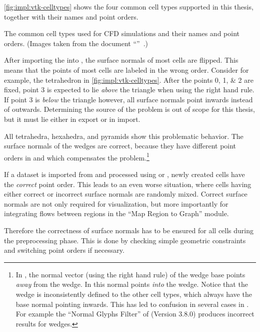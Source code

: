 \autoref{fig:impl:vtk-celltypes} shows the four common cell types supported in this thesis, together with their \vtk names and point orders.%

{The common \threed cell types used for \ac{CFD} simulations and their \vtk names and point orders. (Images taken from the document ``''~\cite{VTKFileFormats}.)}

After importing the \toyotadataset into \vtk, the surface normals of most cells are flipped. This means that the points of most cells are labeled in the wrong order. Consider for example, the tetrahedron in \autoref{fig:impl:vtk-celltypes}. After the points \numlist{0;1;2} are fixed, point \num{3} is expected to lie \emph{above} the triangle when using the right hand rule. If point \num{3} is \emph{below} the triangle however, all surface normals point inwards instead of outwards. Determining the source of the problem is out of scope for this thesis, but it must lie either in  export or in \vtk import. 

All tetrahedra, hexahedra, and pyramids show this problematic behavior. The surface normals of the wedges are correct, because they have different point orders in  and \vtk which compensates the problem.\footnote{In \vtk, the normal vector (using the right hand rule) of the wedge base points \emph{away} from the wedge. In  this normal points \emph{into} the wedge. Notice that the \vtk wedge is inconsistently defined to the other \vtk cell types, which always have the base normal pointing inwards. This has led to confusion in several cases in \vtk. For example the ``Normal Glyphs Filter'' of \paraview (Version 3.8.0) produces incorrect results for wedges.}

If a dataset is imported from  and processed using \vtk or \paraview, newly created cells have the \emph{correct} point order. This leads to an even worse situation, where cells having either correct or incorrect surface normals are randomly mixed. Correct surface normals are not only required for visualization, but more importantly for integrating flows between regions in the ``Map Region to Graph'' module.

Therefore the correctness of surface normals has to be ensured for all cells during the preprocessing phase. This is done by checking simple geometric constraints and switching point orders if necessary.

